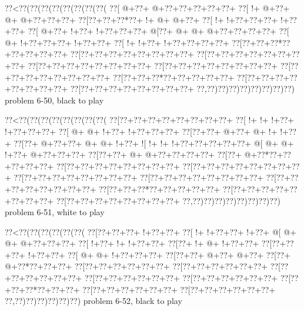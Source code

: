 \vbox{\vbox{\goo
\0??<\0??(\0??(\0??(\0??(\0??(\0??(\0??(\0??(
\0??[\- @+\0??+\- @+\0??+\0??+\0??+\0??+\0??+
\0??[\- !+\- @+\0??+\- @+\- @+\0??+\0??+\0??+
\0??[\0??+\0??+\0??*\0??+\- !+\- @+\- @+\0??+
\0??[\- !+\- !+\0??+\0??+\0??+\- !+\0??+\0??+
\0??[\- @+\0??+\- !+\0??+\- !+\0??+\0??+\0??+
\- @[\0??+\- @+\- @+\- @+\0??+\0??+\0??+\0??+
\0??[\- @+\- !+\0??+\0??+\0??+\- !+\0??+\0??+
\0??[\- !+\- !+\0??+\- !+\0??+\0??+\0??+\0??+
\0??[\0??+\0??+\0??*\0??+\0??+\0??+\0??+\0??+
\0??[\0??+\0??+\0??+\0??+\0??+\0??+\0??+\0??+
\0??[\0??+\0??+\0??+\0??+\0??+\0??+\0??+\0??+
\0??[\0??+\0??+\0??+\0??+\0??+\0??+\0??+\0??+
\0??[\0??+\0??+\0??+\0??+\0??+\0??+\0??+\0??+
\0??[\0??+\0??+\0??+\0??+\0??+\0??+\0??+\0??+
\0??[\0??+\0??+\0??*\0??+\0??+\0??+\0??+\0??+
\0??[\0??+\0??+\0??+\0??+\0??+\0??+\0??+\0??+
\0??[\0??+\0??+\0??+\0??+\0??+\0??+\0??+\0??+
\0??,\0??)\0??)\0??)\0??)\0??)\0??)\0??)\0??)
}
\hfil problem 6-50, black to play\hfil\break
}

\vbox{\vbox{\goo
\0??<\0??(\0??(\0??(\0??(\0??(\0??(\0??(\0??(
\0??[\0??+\0??+\0??+\0??+\0??+\0??+\0??+\0??+
\0??[\- !+\- !+\- !+\0??+\- !+\0??+\0??+\0??+
\0??[\- @+\- @+\- !+\0??+\- !+\0??+\0??+\0??+
\0??[\0??+\0??+\- @+\0??+\- @+\- !+\- !+\0??+
\0??[\0??+\- @+\0??+\0??+\- @+\- @+\- !+\0??+
\- ![\- !+\- !+\- !+\0??+\0??+\0??+\0??+\0??+
\- @[\- @+\- @+\- !+\0??+\- @+\0??+\0??+\0??+
\0??[\0??+\0??+\- @+\- @+\0??+\0??+\0??+\0??+
\0??[\0??+\- @+\0??*\0??+\0??+\0??+\0??+\0??+
\0??[\0??+\0??+\0??+\0??+\0??+\0??+\0??+\0??+
\0??[\0??+\0??+\0??+\0??+\0??+\0??+\0??+\0??+
\0??[\0??+\0??+\0??+\0??+\0??+\0??+\0??+\0??+
\0??[\0??+\0??+\0??+\0??+\0??+\0??+\0??+\0??+
\0??[\0??+\0??+\0??+\0??+\0??+\0??+\0??+\0??+
\0??[\0??+\0??+\0??*\0??+\0??+\0??+\0??+\0??+
\0??[\0??+\0??+\0??+\0??+\0??+\0??+\0??+\0??+
\0??[\0??+\0??+\0??+\0??+\0??+\0??+\0??+\0??+
\0??,\0??)\0??)\0??)\0??)\0??)\0??)\0??)\0??)
}
\hfil problem 6-51, white to play\hfil\break
}

\vbox{\vbox{\goo
\0??<\0??(\0??(\0??(\0??(\0??(\0??(
\0??[\0??+\0??+\0??+\- !+\0??+\0??+
\0??[\- !+\- !+\0??+\0??+\- !+\0??+
\- @[\- @+\- @+\- @+\0??+\0??+\0??+
\0??[\- !+\0??+\- !+\- !+\0??+\0??+
\0??[\0??+\- !+\- @+\- !+\0??+\0??+
\0??[\0??+\0??+\0??+\- !+\0??+\0??+
\0??[\- @+\- @+\- !+\0??+\0??+\0??+
\0??[\0??+\0??+\- @+\0??+\- @+\0??+
\0??[\0??+\- @+\0??*\0??+\0??+\0??+
\0??[\0??+\0??+\0??+\0??+\0??+\0??+
\0??[\0??+\0??+\0??+\0??+\0??+\0??+
\0??[\0??+\0??+\0??+\0??+\0??+\0??+
\0??[\0??+\0??+\0??+\0??+\0??+\0??+
\0??[\0??+\0??+\0??+\0??+\0??+\0??+
\0??[\0??+\0??+\0??*\0??+\0??+\0??+
\0??[\0??+\0??+\0??+\0??+\0??+\0??+
\0??[\0??+\0??+\0??+\0??+\0??+\0??+
\0??,\0??)\0??)\0??)\0??)\0??)\0??)
}
\hfil problem 6-52, black to play\hfil\break
}

